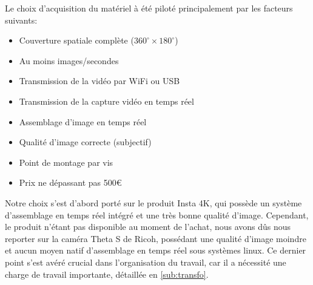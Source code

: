 			Le choix d'acquisition du matériel à été piloté principalement par les facteurs suivants:
			\begin{itemize}[noitemsep]
				\item Couverture spatiale complète ($360^{\circ}\times180^{\circ}$)
				\item Au moins  images/secondes
				\item Transmission de la vidéo par WiFi ou USB
				\item Transmission de la capture vidéo en temps réel
				\item Assemblage d'image en temps réel
				\item Qualité d'image correcte (subjectif)
				\item Point de montage par vis
				\item Prix ne dépassant pas 500\euro
			\end{itemize}
			
			Notre choix s'est d'abord porté sur le produit Insta 4K\cite{insta360}, qui possède un système d'assemblage en temps réel intégré et une très bonne qualité d'image. Cependant, le produit n'étant pas disponible au moment de l'achat, nous avons dûs nous reporter sur la caméra Theta S de Ricoh\cite{ricohthetas}, possédant une qualité d'image moindre et aucun moyen natif d'assemblage en temps réel sous systèmes linux. Ce dernier point s'est avéré crucial dans l'organisation du travail, car il a nécessité une charge de travail importante, détaillée en \ref{sub:transfo}.
